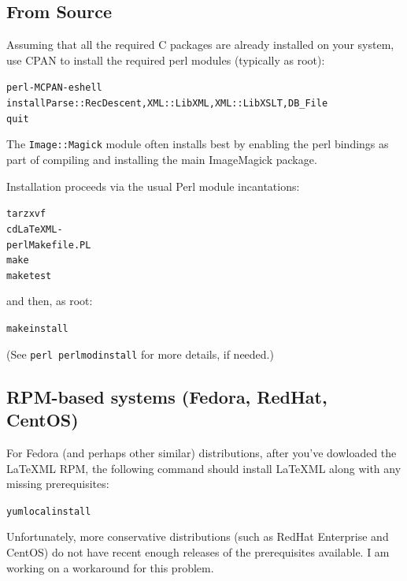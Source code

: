 \documentclass{article}
\begin{document}
\subsection{From Source}
Assuming that all the required C packages are already installed on your system,
  use CPAN to install the required perl modules (typically as root):
\begin{alltt}
   perl -MCPAN -e shell
   install Parse::RecDescent, XML::LibXML, XML::LibXSLT, DB_File
   quit
\end{alltt}
The \texttt{Image::Magick} module often installs best by enabling the
perl bindings as part of compiling and installing the main ImageMagick package.

Installation proceeds via the usual Perl module incantations:
\begin{alltt}
   tar zxvf  \CurrentTarball\\
   cd LaTeXML-\CurrentVersion\\
   perl Makefile.PL
   make
   make test
\end{alltt}
and then, as root:
\begin{alltt}
   make install
\end{alltt}
(See \texttt{perl perlmodinstall} for more details, if needed.)


\subsection[RPM-based systems]{RPM-based systems (Fedora, RedHat, CentOS)}
For Fedora (and perhaps other similar) distributions, 
after you've dowloaded the LaTeXML RPM, the following
command should install LaTeXML along with any missing prerequisites:
\begin{alltt}
   yum localinstall \CurrentRPM
\end{alltt}

Unfortunately, more conservative distributions
(such as RedHat Enterprise and CentOS)
do not have recent enough releases of the prerequisites available.
I am working on a workaround for this problem.
\end{document}
